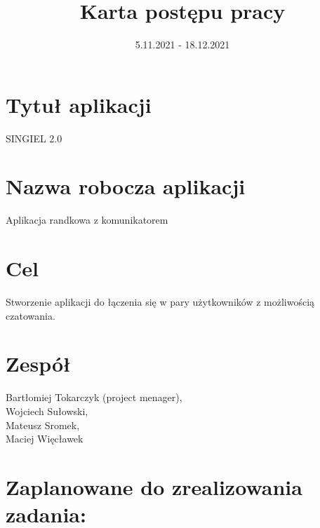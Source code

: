 \documentclass[12pt,a4paper]{article}
\begin{document}
\title{Karta postępu pracy}
\date{5.11.2021 - 18.12.2021}

\maketitle


\section*{Tytuł aplikacji}
SINGIEL 2.0
\section*{Nazwa robocza aplikacji}
Aplikacja randkowa z komunikatorem
\section*{Cel}
Stworzenie aplikacji do łączenia się w pary użytkowników z możliwością czatowania.
\section*{Zespół}
Bartłomiej Tokarczyk  (project menager), \\
Wojciech Sułowski, \\
Mateusz Sromek, \\
Maciej Więcławek \\
\newpage

\section{Zaplanowane do zrealizowania zadania:}
\end{document}
